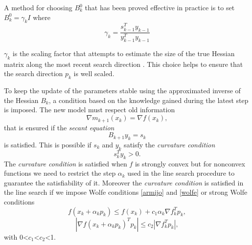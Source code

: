 A method for choosing $B^0_{k}$ that has been proved effective in practice is to set $B^0_{k}=\gamma_{k}I$  where 
\begin{equation}
\gamma_{k}= \frac{s^T_{k-1}y_{k-1}}{y^T_{k-1}y_{k-1}}
\end{equation}

$\gamma_{k}$ is the scaling factor that attempts to estimate the size of the true Hessian matrix along the most recent search direction \cite{numerical}. This choice helps to ensure that the search direction $p_{k}$ is well scaled.

To keep the update of the parameters stable using the approximated inverse of the Hessian $B_{k}$, a condition based on the knowledge gained during the latest step is imposed. The new model must respect old information 
\begin{equation}
\label{LBFGS-FirstCondition}
\nabla m_{k+1}(x_{k})=\nabla f(x_{k}),
\end{equation}
that is ensured if the \textit{secant equation}
\label{secant-equation}
\begin{equation}
B_{k+1}y_{k}=s_{k}
\end{equation}
is satisfied. This is possible if $s_{k}$ and $y_{k}$ satisfy the \textit{curvature condition} 
\begin{equation}
\label{eq:curvature-condition}
s_{k}^T y_{k}>0.
\end{equation}
The \textit{curvature condition} is satisfied when $f$ is strongly convex but for nonconvex functions we need to restrict the step $\alpha_{k}$ used in the line search procedure to guarantee the satisfiability of it.
Moreover the \textit{curvature condition} is satisfied in the line search if we impose Wolfe conditions \ref{armijo} and \ref{wolfe}
or strong Wolfe conditions
\begin{equation}
f(x_k + \alpha_kp_k ) \leq f (x_k ) + c_1 \alpha_k \nabla f_k^T p_k,
\end{equation}
\begin{equation}
|\nabla f(x_k + \alpha_{k} p_k )^T p_k| \leq c_2 |\nabla f_k^T p_k| ,
\end{equation}
with 0<$c_1$<$c_2$<1. 

